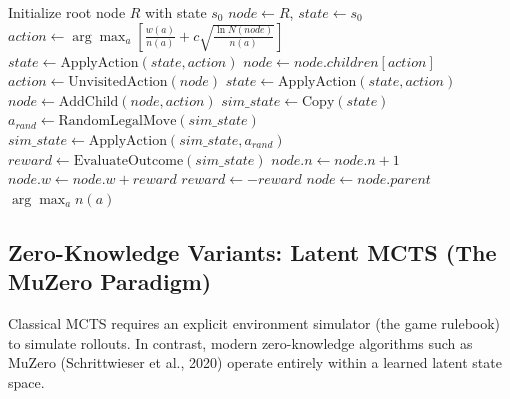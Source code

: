 \documentclass[12pt,a4paper]{article}
\begin{document}
\begin{algorithm}[H]
\caption{Classical Explicit MCTS (Disjoint-Set Rollout Engine)}
\begin{algorithmic}[1]
    \State Initialize root node $R$ with state $s_0$
        \State $node \gets R$, $state \gets s_0$
         
            \State $action \gets \arg\max_{a} \left[ \frac{w(a)}{n(a)} + c \sqrt{\frac{\ln N(node)}{n(a)}} \right]$
            \State $state \gets \text{ApplyAction}(state, action)$
            \State $node \gets node.children[action]$
        \EndWhile
         
            \State $action \gets \text{UnvisitedAction}(node)$
            \State $state \gets \text{ApplyAction}(state, action)$
            \State $node \gets \text{AddChild}(node, action)$
        \EndIf
        \State $sim\_state \gets \text{Copy}(state)$ 
            \State $a_{rand} \gets \text{RandomLegalMove}(sim\_state)$
            \State $sim\_state \gets \text{ApplyAction}(sim\_state, a_{rand})$
        \EndWhile
        \State $reward \gets \text{EvaluateOutcome}(sim\_state)$
         
            \State $node.n \gets node.n + 1$
            \State $node.w \gets node.w + reward$
            \State $reward \gets -reward$ 
            \State $node \gets node.parent$
        \EndWhile
    \EndFor
    \State \Return $\arg\max_{a} n(a)$
\EndFunction
\end{algorithmic}
\end{algorithm}

\subsection{Zero-Knowledge Variants: Latent MCTS (The MuZero Paradigm)}
Classical MCTS requires an explicit environment simulator (the game rulebook) to simulate rollouts. In contrast, modern zero-knowledge algorithms such as MuZero (Schrittwieser et al., 2020) operate entirely within a learned latent state space.
\end{document}
